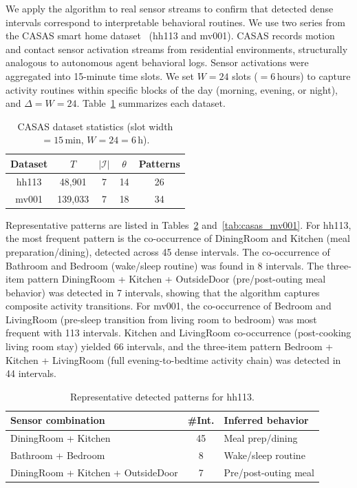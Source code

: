 We apply the algorithm to real sensor streams to confirm that detected
dense intervals correspond to interpretable behavioral routines.
We use two series from the CASAS smart home
dataset~\cite{casas2013} (hh113 and mv001).
CASAS records motion and contact sensor activation streams from
residential environments, structurally analogous to autonomous agent
behavioral logs.
Sensor activations were aggregated into 15-minute time slots.
We set $W = 24$ slots ($= 6$\,hours) to capture activity routines
within specific blocks of the day (morning, evening, or night),
and $\Delta = W = 24$.
Table~\ref{tab:casas_stats} summarizes each dataset.

\begin{table}[t]
\caption{CASAS dataset statistics (slot width $= 15$\,min, $W = 24 = 6$\,h).}
\label{tab:casas_stats}
\begin{center}
\begin{tabular}{ccccc}
\hline
Dataset & $T$ & $|\mathcal{I}|$ & $\theta$ & Patterns \\\hline
hh113 & 48{,}901 & 7 & 14 & 26 \\
mv001 & 139{,}033 & 7 & 18 & 34 \\\hline
\end{tabular}
\end{center}
\end{table}

Representative patterns are listed in
Tables~\ref{tab:casas_hh113} and~\ref{tab:casas_mv001}.
For hh113, the most frequent pattern is the co-occurrence of
DiningRoom and Kitchen (meal preparation/dining), detected across
45 dense intervals.
The co-occurrence of Bathroom and Bedroom (wake/sleep routine)
was found in 8 intervals.
The three-item pattern DiningRoom + Kitchen + OutsideDoor (pre/post-outing
meal behavior) was detected in 7 intervals, showing that the algorithm
captures composite activity transitions.
For mv001, the co-occurrence of Bedroom and LivingRoom
(pre-sleep transition from living room to bedroom) was most frequent
with 113 intervals.
Kitchen and LivingRoom co-occurrence (post-cooking living room stay)
yielded 66 intervals, and the three-item pattern
Bedroom + Kitchen + LivingRoom (full evening-to-bedtime activity chain)
was detected in 44 intervals.

\begin{table}[t]
\caption{Representative detected patterns for hh113.}
\label{tab:casas_hh113}
\begin{center}
\footnotesize
\begin{tabular}{p{3.5cm}cp{2.0cm}}
\hline
Sensor combination & \#Int. & Inferred behavior \\\hline
DiningRoom + Kitchen               & 45 & Meal prep/dining \\
Bathroom + Bedroom                 &  8 & Wake/sleep routine \\
DiningRoom + Kitchen + OutsideDoor &  7 & Pre/post-outing meal \\\hline
\end{tabular}
\end{center}
\end{table}

